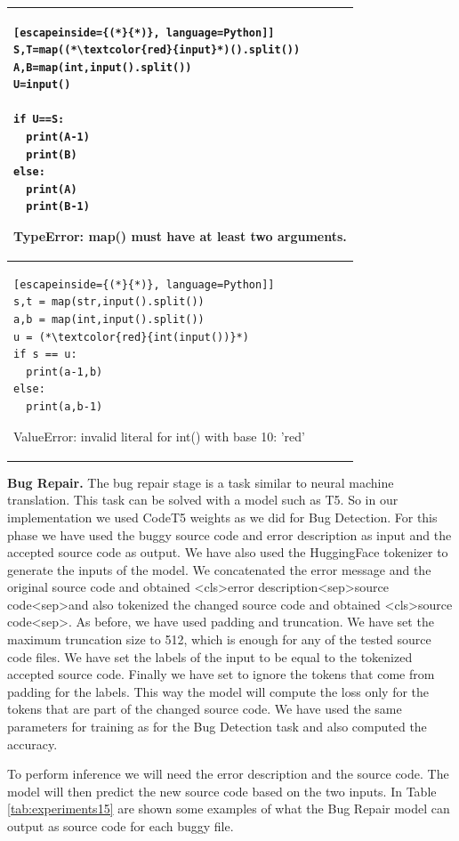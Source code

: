 \documentclass[12pt,a4paper]{report}
\begin{document}
\begin{appendices}
\begin{table}[H]
\begin{tabular}{p{15cm}}
\hline
\begin{lstlisting}[escapeinside={(*}{*)}, language=Python]]
S,T=map((*\textcolor{red}{input}*)().split()) 
A,B=map(int,input().split()) 
U=input() 
 
if U==S: 
  print(A-1) 
  print(B) 
else: 
  print(A) 
  print(B-1)
\end{lstlisting}

TypeError: map() must have at least two arguments.
\\

\hline
\begin{lstlisting}[escapeinside={(*}{*)}, language=Python]]
s,t = map(str,input().split()) 
a,b = map(int,input().split()) 
u = (*\textcolor{red}{int(input())}*)
if s == u: 
  print(a-1,b) 
else: 
  print(a,b-1)
\end{lstlisting}

ValueError: invalid literal for int() with base 10: 'red'
\\

\end{tabular}
\end{table}

\textbf{Bug Repair.} The bug repair stage is a task similar to neural machine translation. This task can be solved with a model such as T5. So in our implementation we used CodeT5 weights as we did for Bug Detection. For this phase we have used the buggy source code and error description as input and the accepted source code as output. We have also used the HuggingFace tokenizer to generate the inputs of the model. We concatenated the error message and the original source code and obtained \textless{cls}\textgreater error description\textless{sep}\textgreater source code\textless{sep}\textgreater and also tokenized the changed source code and obtained \textless{cls}\textgreater source code\textless{sep}\textgreater. As before, we have used padding and truncation. We have set the maximum truncation size to 512, which is enough for any of the tested source code files. We have set the labels of the input to be equal to the tokenized accepted source code. Finally we have set to ignore the tokens that come from padding for the labels. This way the model will compute the loss only for the tokens that are part of the changed source code. We have used the same parameters for training as for the Bug Detection task and also computed the accuracy.

To perform inference we will need the error description and the source code. The model will then predict the new source code based on the two inputs. In Table \ref{tab:experiments15} are shown some examples of what the Bug Repair model can output as source code for each buggy file.


\end{appendices}
\end{document}
